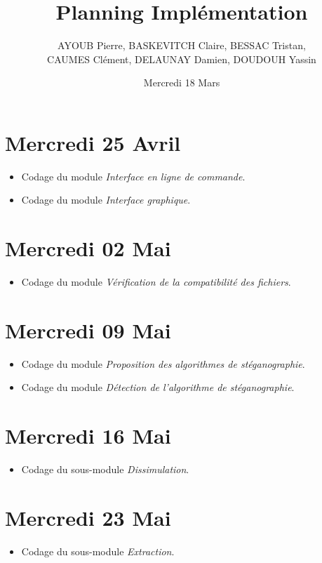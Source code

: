\documentclass[11pt]{article}
\title{Planning Implémentation }
\author{AYOUB Pierre, BASKEVITCH Claire, BESSAC Tristan, \\
CAUMES Clément, DELAUNAY Damien, DOUDOUH Yassin}
\date{Mercredi 18 Mars}
\begin{document}
\maketitle

\section{Mercredi 25 Avril}
\begin {itemize}
\item Codage du module \textit{Interface en ligne de commande}.
\item Codage du module \textit{Interface graphique}. 
\end{itemize}

\section{Mercredi 02 Mai}
\begin {itemize}
\item Codage du module \textit{Vérification de la compatibilité des fichiers}. 
\end{itemize}

\section{Mercredi 09 Mai}
\begin {itemize}
\item Codage du module \textit{Proposition des algorithmes de stéganographie}. 
\item Codage du module \textit{Détection de l'algorithme de stéganographie}. 
\end{itemize}

\section{Mercredi 16 Mai}
\begin {itemize}
\item Codage du sous-module \textit{Dissimulation}. 
\end{itemize}

\section{Mercredi 23 Mai}
\begin {itemize}
\item Codage du sous-module \textit{Extraction}. 
\end{itemize}
\end{document}
